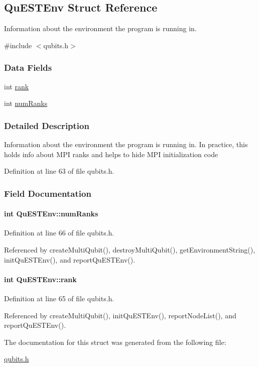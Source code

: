 \hypertarget{structQuESTEnv}{
\subsection{QuESTEnv Struct Reference}
\label{structQuESTEnv}
}


Information about the environment the program is running in.  


{\ttfamily \#include $<$qubits.h$>$}\subsubsection*{Data Fields}
\begin{DoxyCompactItemize}
\item 
int \hyperlink{structQuESTEnv_aa648bb336cf8598467cb62db00b9cee8}{rank}
\item 
int \hyperlink{structQuESTEnv_af22aacd7c9905accae28484785c193b4}{numRanks}
\end{DoxyCompactItemize}


\subsubsection{Detailed Description}
Information about the environment the program is running in. In practice, this holds info about MPI ranks and helps to hide MPI initialization code 

Definition at line 63 of file qubits.h.

\subsubsection{Field Documentation}
\hypertarget{structQuESTEnv_af22aacd7c9905accae28484785c193b4}{
\paragraph[{numRanks}]{\setlength{\rightskip}{0pt plus 5cm}int {\bf QuESTEnv::numRanks}}\hfill}
\label{structQuESTEnv_af22aacd7c9905accae28484785c193b4}


Definition at line 66 of file qubits.h.

Referenced by createMultiQubit(), destroyMultiQubit(), getEnvironmentString(), initQuESTEnv(), and reportQuESTEnv().\hypertarget{structQuESTEnv_aa648bb336cf8598467cb62db00b9cee8}{
\paragraph[{rank}]{\setlength{\rightskip}{0pt plus 5cm}int {\bf QuESTEnv::rank}}\hfill}
\label{structQuESTEnv_aa648bb336cf8598467cb62db00b9cee8}


Definition at line 65 of file qubits.h.

Referenced by createMultiQubit(), initQuESTEnv(), reportNodeList(), and reportQuESTEnv().

The documentation for this struct was generated from the following file:\begin{DoxyCompactItemize}
\item 
\hyperlink{qubits_8h}{qubits.h}\end{DoxyCompactItemize}
